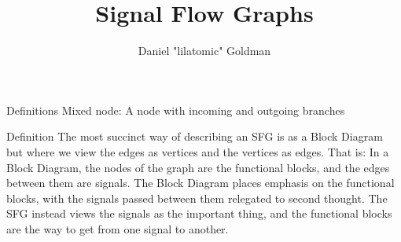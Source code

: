 \documentclass{../templates/topic}
\title{Signal Flow Graphs}
\author{Daniel "lilatomic" Goldman}
\begin{document}
\maketitle

\begin{section}{Definitions}
	Mixed node: A node with incoming and outgoing branches
\end{section}

\begin{section}{Definition}
	The most succinct way of describing an SFG is as a Block Diagram but where we view the edges as vertices and the vertices as edges. That is: In a Block Diagram, the nodes of the graph are the functional blocks, and the edges between them are signals. The Block Diagram places emphasis on the functional blocks, with the signals passed between them relegated to second thought. The SFG instead views the signals as the important thing, and the functional blocks are the way to get from one signal to another.


\end{section}
\end{document}
